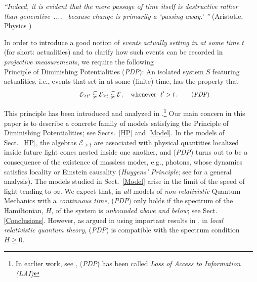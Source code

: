 \documentclass[12pt]{article}
\begin{document}
\hspace{0.5cm}\textit{``Indeed, it is evident that the mere passage of time itself is destructive rather than
\mbox{generative ..., } because change is primarily a `passing away.' ''}  (Aristotle, Physics )

In order to introduce a good notion of \textit{events actually setting in at some time $t$} (for short: actualities) and to clarify
how such events can be recorded in \textit{projective measurements}, we require the following \\

{Principle of Diminishing Potentialities} (\textit{PDP}): An isolated system $S$ featuring actualities, i.e., events that set in
at some (finite) time, has the property that
\begin{equation}\label{PDP}
 \hspace{4.2cm}  \mathcal{E}_{\geq t'} \subsetneqq \mathcal{E}_{\geq t} \subsetneqq \mathcal{E}\,, \quad \text{whenever}\,\,\,\, t'>t\,. \qquad\, (\textit{PDP}) \hspace{2.4cm} \square
 \end{equation}


This principle has been introduced and analyzed in \cite{F-Schub, BFS, Fr1, Fr2}.\footnote{In earlier work, see \cite{BFS}, (\textit{PDP}) has
been called \textit{Loss of Access to Information (LAI)}}
Our main concern in this paper is to describe a concrete family of models satisfying the Principle of Diminishing Potentialities;
see Sects.~\ref{HP} and \ref{Model}. In the models of Sect.~\ref{HP}, the algebras $\mathcal{E}_{\geq t}$ are associated with
physical quantities localized inside future light cones nested inside one another, and (\textit{PDP}) turns out to be a
consequence of the existence of massless modes, e.g., photons, whose dynamics satisfies locality or Einstein
causality (\textit{Huygens' Principle}; see \cite{Buchholz} for a general analysis).
The models studied in Sect.~\ref{Model} arise in the limit of the speed of light tending to $\infty$. We expect that, in
\textit{all} models of \textit{non-relativistic} Quantum Mechanics with a \textit{continuous time}, (\textit{PDP}) only holds
if the spectrum of the Hamiltonian, $H$, of the system is \textit{unbounded above and below}; see Sect. \ref{Conclusions}.
However, as argued in \cite{Fr2} using important results in \cite{Buchholz}, in \textit{local relativistic quantum theory},
(\textit{PDP}) is compatible with the spectrum condition
$H\geq 0$.\\
\end{document}
